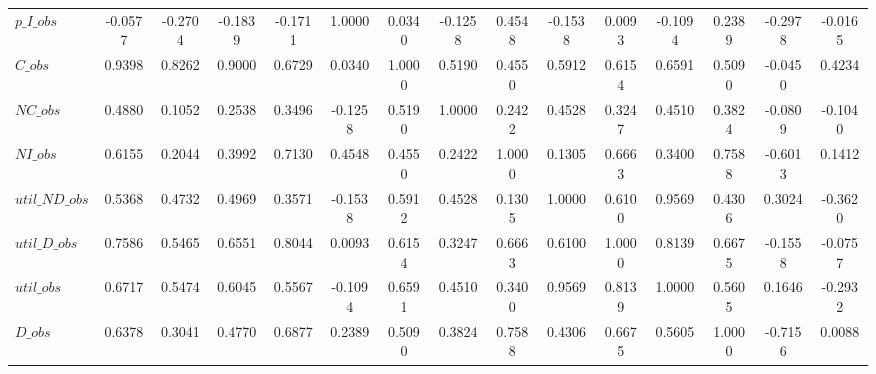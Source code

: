 \begin{center}
\begin{longtable}{lcccccccccccccc}
$p\_I\_obs      $	 & 	          -0.0577	 & 	          -0.2704	 & 	          -0.1839	 & 	          -0.1711	 & 	           1.0000	 & 	           0.0340	 & 	          -0.1258	 & 	           0.4548	 & 	          -0.1538	 & 	           0.0093	 & 	          -0.1094	 & 	           0.2389	 & 	          -0.2978	 & 	          -0.0165 \\ 
$C\_obs         $	 & 	           0.9398	 & 	           0.8262	 & 	           0.9000	 & 	           0.6729	 & 	           0.0340	 & 	           1.0000	 & 	           0.5190	 & 	           0.4550	 & 	           0.5912	 & 	           0.6154	 & 	           0.6591	 & 	           0.5090	 & 	          -0.0450	 & 	           0.4234 \\ 
$NC\_obs        $	 & 	           0.4880	 & 	           0.1052	 & 	           0.2538	 & 	           0.3496	 & 	          -0.1258	 & 	           0.5190	 & 	           1.0000	 & 	           0.2422	 & 	           0.4528	 & 	           0.3247	 & 	           0.4510	 & 	           0.3824	 & 	          -0.0809	 & 	          -0.1040 \\ 
$NI\_obs        $	 & 	           0.6155	 & 	           0.2044	 & 	           0.3992	 & 	           0.7130	 & 	           0.4548	 & 	           0.4550	 & 	           0.2422	 & 	           1.0000	 & 	           0.1305	 & 	           0.6663	 & 	           0.3400	 & 	           0.7588	 & 	          -0.6013	 & 	           0.1412 \\ 
$util\_ND\_obs  $	 & 	           0.5368	 & 	           0.4732	 & 	           0.4969	 & 	           0.3571	 & 	          -0.1538	 & 	           0.5912	 & 	           0.4528	 & 	           0.1305	 & 	           1.0000	 & 	           0.6100	 & 	           0.9569	 & 	           0.4306	 & 	           0.3024	 & 	          -0.3620 \\ 
$util\_D\_obs   $	 & 	           0.7586	 & 	           0.5465	 & 	           0.6551	 & 	           0.8044	 & 	           0.0093	 & 	           0.6154	 & 	           0.3247	 & 	           0.6663	 & 	           0.6100	 & 	           1.0000	 & 	           0.8139	 & 	           0.6675	 & 	          -0.1558	 & 	          -0.0757 \\ 
$util\_obs      $	 & 	           0.6717	 & 	           0.5474	 & 	           0.6045	 & 	           0.5567	 & 	          -0.1094	 & 	           0.6591	 & 	           0.4510	 & 	           0.3400	 & 	           0.9569	 & 	           0.8139	 & 	           1.0000	 & 	           0.5605	 & 	           0.1646	 & 	          -0.2932 \\ 
$D\_obs         $	 & 	           0.6378	 & 	           0.3041	 & 	           0.4770	 & 	           0.6877	 & 	           0.2389	 & 	           0.5090	 & 	           0.3824	 & 	           0.7588	 & 	           0.4306	 & 	           0.6675	 & 	           0.5605	 & 	           1.0000	 & 	          -0.7156	 & 	           0.0088 \\ 

\end{longtable}
\end{center}
